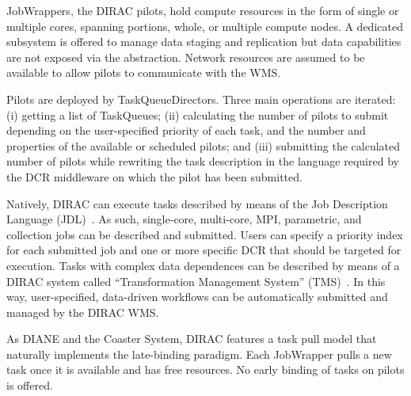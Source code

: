 \documentclass{sig-alternate}
\begin{document}

JobWrappers, the DIRAC pilots, hold compute resources in the form of single or
multiple cores, spanning portions, whole, or multiple compute nodes. A dedicated
subsystem is offered to manage data staging and replication but data
capabilities are not exposed via the \pilot abstraction. Network resources are
assumed to be available to allow pilots to communicate with the WMS.

Pilots are deployed by TaskQueueDirectors. Three main operations are iterated:
(i) getting a list of TaskQueues; (ii) calculating the number of pilots to
submit depending on the user-specified priority of each task, and the number and
properties of the available or scheduled pilots; and (iii) submitting the
calculated number of pilots while rewriting the task description in the language
required by the DCR middleware on which the pilot has been submitted.

Natively, DIRAC can execute tasks described by means of the Job Description
Language (JDL)~\cite{pacini2006job}. As such, single-core, multi-core, MPI,
parametric, and collection jobs can be described and submitted. Users can
specify a priority index for each submitted job and one or more specific DCR
that should be targeted for execution. Tasks with complex data dependences can
be described by means of a DIRAC system called ``Transformation Management
System'' (TMS)~\cite{tsaregorodtsev2006dirac}. In this way, user-specified,
data-driven workflows can be automatically submitted and managed by the DIRAC
WMS.

As DIANE and the Coaster System, DIRAC features a task pull model that naturally
implements the late-binding paradigm. Each JobWrapper pulls a new task once it
is available and has free resources. No early binding of tasks on pilots is
offered.

%

\end{document}
